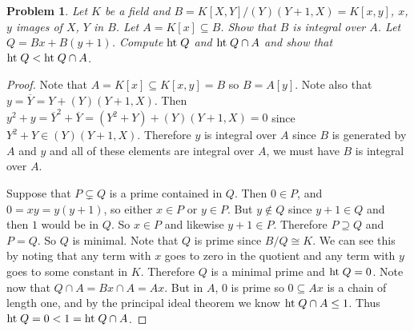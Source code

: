 \documentclass{article}
\newcommand{\Ht}{\textup{ht}\;}
\newtheorem{problem}{Problem}
\begin{document}
\begin{problem}
Let $K$ be a field and $B = K[X,Y]/(Y)(Y+1,X) = K[x,y]$, $x$, $y$ images of $X$, $Y$ in $B$. Let $A = K[x] \subseteq B$. Show that $B$ is integral over $A$. Let $Q = Bx + B(y + 1)$. Compute $\Ht Q$ and $\Ht Q \cap A$ and show that $\Ht Q < \Ht Q \cap A$.
\end{problem}
\begin{proof}
Note that $A = K[x] \subseteq K[x,y] = B$ so $B = A[y]$. Note also that $y = \overline{Y} = Y + (Y)(Y+1,X)$. Then $y^2 + y = \overline{Y}^2 + \overline{Y} = (Y^2 + Y) + (Y)(Y+1,X) = 0$ since $Y^2 + Y \in (Y)(Y+1,X)$. Therefore $y$ is integral over $A$ since $B$ is generated by $A$ and $y$ and all of these elements are integral over $A$, we must have $B$ is integral over $A$.

Suppose that $P \subsetneq Q$ is a prime contained in $Q$. Then $0 \in P$, and $0 = xy = y(y+1)$, so either $x \in P$ or $y \in P$. But $y \notin Q$ since $y+1 \in Q$ and then $1$ would be in $Q$. So $x \in P$ and likewise $y+1 \in P$. Therefore $P \supseteq Q$ and $P = Q$. So $Q$ is minimal. Note that $Q$ is prime since $B/Q \cong K$. We can see this by noting that any term with $x$ goes to zero in the quotient and any term with $y$ goes to some constant in $K$. Therefore $Q$ is a minimal prime and $\Ht Q = 0$. Note now that $Q \cap A = Bx \cap A = Ax$. But in $A$, $0$ is prime so $0 \subseteq Ax$ is a chain of length one, and by the principal ideal theorem we know $\Ht Q \cap A \leq 1$. Thus $\Ht Q = 0 < 1 = \Ht Q \cap A$.
\end{proof}
\end{document}
